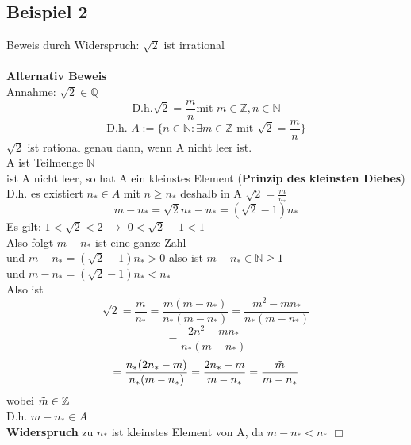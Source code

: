 \documentclass{article}
\begin{document}
        \subsection{Beispiel 2}
        Beweis durch Widerspruch: $\sqrt{2}$ ist irrational\\\\
        \textbf{Alternativ Beweis}\\
            Annahme: $\sqrt{2}\in \mathbb{Q}$\\
            $$\text{D.h.} \sqrt{2}=\frac{m}{n} \text{mit }m \in \mathbb{Z}, n\in \mathbb{N}$$
            $$\text{D.h. } A:= \{ n\in \mathbb{N} : \exists m \in \mathbb{Z} \text{ mit } \sqrt{2}=\frac{m}{n}\}$$
            $\sqrt{2}$ ist rational genau dann, wenn A  nicht leer ist.\\
            A ist Teilmenge $\mathbb{N}$\\
            ist A nicht leer, so hat A ein kleinstes Element (\textbf{Prinzip des kleinsten Diebes})\\
            D.h. es existiert $n_*\in A$ mit $n \ge n_*$ deshalb in A $\sqrt{2}=\frac{m}{n_*}$\\
            $$m-n_*=\sqrt{2}n_*-n_*=(\sqrt{2}-1)n_*$$
            Es gilt: $1<\sqrt{2}<2$ $\to$ $0<\sqrt{2}-1< 1$\\
            Also folgt $m-n_*$ ist eine ganze Zahl\\
            und $m-n_*=(\sqrt{2}-1)n_*>0$ also ist $m-n_* \in \mathbb{N} \ge 1$\\
            und $m-n_*=(\sqrt{2}-1)n_*< n_*$\\
            Also ist
            $$\sqrt{2}=\frac{m}{n_*} =
            \frac{m(m-n_*)}{n_*(m-n_*)}=
            \frac{m^2-mn_*}{n_*(m-n_*)}$$
            $$=\frac{2n^2-mn_*}{n_*(m-n_*)}$$
            $$=\frac{n_*(2n_*-m)}{n_*(m-n_*)}=
            \frac{2n_*-m}{m-n_*}=
            \frac{\Tilde{m}}{m-n_*}$$
            wobei $\Tilde{m} \in \mathbb{Z}$\\
            D.h. $m-n_* \in A$\\
            \textbf{Widerspruch} zu $n_*$ ist kleinstes Element von A, da $m-n_*<n_*$
	    \hfill $\Box$
\end{document}

